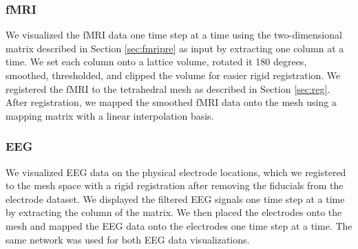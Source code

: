 \subsubsection{fMRI}

We visualized the fMRI data one time step at a time using the two-dimensional matrix described in Section \ref{sec:fmripre} as input by extracting one column at a time. We set each column onto a lattice volume, rotated it 180 degrees, smoothed, thresholded, and clipped the volume for easier rigid registration. We registered the fMRI to the tetrahedral mesh as described in Section \ref{sec:reg}. After registration, we mapped the smoothed fMRI data onto the mesh using a mapping matrix with a linear interpolation basis.

\subsubsection{EEG}

We visualized EEG data on the physical electrode locations, which we registered to the mesh space with a rigid registration after removing the fiducials from the electrode dataset. We displayed the filtered EEG signals one time step at a time by extracting the column of the matrix. We then placed the electrodes onto the mesh and mapped the EEG data onto the electrodes one time step at a time. The same network was used for both EEG data visualizations.

